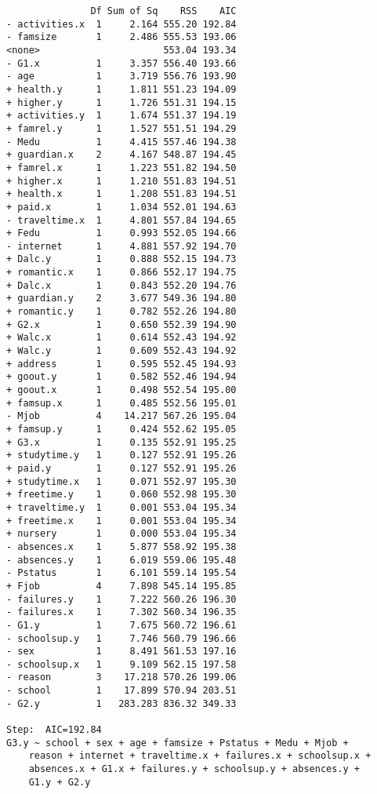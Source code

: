 \documentclass[11pt]{article}
\begin{document}
\begin{enumerate}
\begin{verbatim}
               Df Sum of Sq    RSS    AIC
- activities.x  1     2.164 555.20 192.84
- famsize       1     2.486 555.53 193.06
<none>                      553.04 193.34
- G1.x          1     3.357 556.40 193.66
- age           1     3.719 556.76 193.90
+ health.y      1     1.811 551.23 194.09
+ higher.y      1     1.726 551.31 194.15
+ activities.y  1     1.674 551.37 194.19
+ famrel.y      1     1.527 551.51 194.29
- Medu          1     4.415 557.46 194.38
+ guardian.x    2     4.167 548.87 194.45
+ famrel.x      1     1.223 551.82 194.50
+ higher.x      1     1.210 551.83 194.51
+ health.x      1     1.208 551.83 194.51
+ paid.x        1     1.034 552.01 194.63
- traveltime.x  1     4.801 557.84 194.65
+ Fedu          1     0.993 552.05 194.66
- internet      1     4.881 557.92 194.70
+ Dalc.y        1     0.888 552.15 194.73
+ romantic.x    1     0.866 552.17 194.75
+ Dalc.x        1     0.843 552.20 194.76
+ guardian.y    2     3.677 549.36 194.80
+ romantic.y    1     0.782 552.26 194.80
+ G2.x          1     0.650 552.39 194.90
+ Walc.x        1     0.614 552.43 194.92
+ Walc.y        1     0.609 552.43 194.92
+ address       1     0.595 552.45 194.93
+ goout.y       1     0.582 552.46 194.94
+ goout.x       1     0.498 552.54 195.00
+ famsup.x      1     0.485 552.56 195.01
- Mjob          4    14.217 567.26 195.04
+ famsup.y      1     0.424 552.62 195.05
+ G3.x          1     0.135 552.91 195.25
+ studytime.y   1     0.127 552.91 195.26
+ paid.y        1     0.127 552.91 195.26
+ studytime.x   1     0.071 552.97 195.30
+ freetime.y    1     0.060 552.98 195.30
+ traveltime.y  1     0.001 553.04 195.34
+ freetime.x    1     0.001 553.04 195.34
+ nursery       1     0.000 553.04 195.34
- absences.x    1     5.877 558.92 195.38
- absences.y    1     6.019 559.06 195.48
- Pstatus       1     6.101 559.14 195.54
+ Fjob          4     7.898 545.14 195.85
- failures.y    1     7.222 560.26 196.30
- failures.x    1     7.302 560.34 196.35
- G1.y          1     7.675 560.72 196.61
- schoolsup.y   1     7.746 560.79 196.66
- sex           1     8.491 561.53 197.16
- schoolsup.x   1     9.109 562.15 197.58
- reason        3    17.218 570.26 199.06
- school        1    17.899 570.94 203.51
- G2.y          1   283.283 836.32 349.33

Step:  AIC=192.84
G3.y ~ school + sex + age + famsize + Pstatus + Medu + Mjob + 
    reason + internet + traveltime.x + failures.x + schoolsup.x + 
    absences.x + G1.x + failures.y + schoolsup.y + absences.y + 
    G1.y + G2.y


\end{verbatim}
\end{enumerate}
\end{document}
